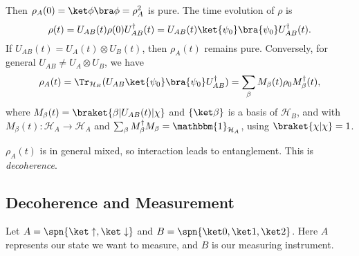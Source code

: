 \documentclass[12pt]{article}
\begin{document}
Then $\rho_A(0) = \ket \phi \bra \phi = \rho_A^2$ is pure. The time evolution of $\rho$ is
\[
	\rho(t) = U_{AB}(t) \rho(0) U_{AB}^{\dagger}(t) = U_{AB}(t) \ket{\psi_0} \bra{\psi_0} U_{AB}^{\dagger}(t).
\]
If $U_{AB}(t) = U_A(t) \otimes U_B(t)$, then $\rho_A(t)$ remains pure. Conversely, for general $U_{AB} \neq U_A \otimes U_B$, we have
\[
	\rho_A(t) = \Tr_{\mathcal{H}_B}(U_{AB} \ket{\psi_0} \bra{\psi_0} U_{AB}^{\dagger}) = \sum_\beta M_\beta(t) \rho_0 M_\beta^{\dagger}(t),
\] 
where $M_\beta(t) = \braket{\beta|U_{AB}(t)|\chi}$ and $\{\ket \beta\}$ is a basis of $\mathcal{H}_B$, and with $M_\beta(t) : \mathcal{H}_A \to \mathcal{H}_A$ and $\sum_\beta M_\beta^{\dagger} M_\beta = \mathbbm{1}_{\mathcal{H}_A}$, using $\braket{\chi|\chi} = 1$.

$\rho_A(t)$ is in general mixed, so interaction leads to entanglement. This is \emph{decoherence}.


\subsection{Decoherence and Measurement}
\label{sub:dec_meas}

Let $A = \spn \{ \ket \uparrow, \ket \downarrow \}$ and $B = \spn \{ \ket 0, \ket 1, \ket 2\}$. Here $A$ represents our state we want to measure, and $B$ is our measuring instrument.
\end{document}
